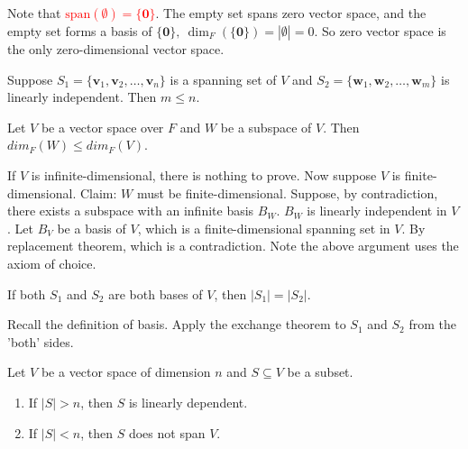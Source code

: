 \documentclass[12pt]{article}
\begin{document}
Note that \textcolor{red}{$\text{span}(\emptyset)=\{\mathbf{0}\}$}.
The empty set spans zero vector space, and the empty set forms a basis of $\{\mathbf{0}\},\ \dim_F(\{\mathbf{0}\})=|\emptyset|=0$.
So zero vector space is the only zero-dimensional vector space.

\begin{theorem}
    Suppose $S_1=\{\mathbf{v}_1,\mathbf{v}_2, \ldots ,\mathbf{v}_n\}$ is a spanning set of $V$ and
    $S_2=\{\mathbf{w}_1, \mathbf{w}_2, \ldots ,\mathbf{w}_m\}$ is linearly independent.
    Then $m\leq n$.
\end{theorem}

\begin{theorem}
    Let $V$ be a vector space over $F$ and $W$ be a subspace of $V$. Then $dim_F(W)\leq dim_F(V)$.
\end{theorem}

\begin{pfbox}
    If $V$ is infinite-dimensional, there is nothing to prove.
    Now suppose $V$ is finite-dimensional. Claim: $W$ must be finite-dimensional.
    Suppose, by contradiction, there exists a subspace with an infinite basis $B_W$. $B_W$ is linearly independent in $V$. 
    Let $B_V$ be a basis of $V$, which is a finite-dimensional spanning set in $V$. By replacement theorem, which is a contradiction.
    Note the above argument uses the axiom of choice.
\end{pfbox}

\begin{theorem}
    If both $S_1$ and $S_2$ are both bases of $V$, then $|S_1|=|S_2|$.
\end{theorem}

\begin{pfbox}  
    Recall the definition of basis.
    Apply the exchange theorem to $S_1$ and $S_2$ from the 'both' sides.
\end{pfbox}



\begin{theorem}
    Let $V$ be a vector space of dimension $n$ and $S\subseteq V$ be a subset.
    \begin{enumerate}
        \item If $|S|>n$, then $S$ is linearly dependent.
        \item If $|S|<n$, then $S$ does not span $V$.
    \end{enumerate}
\end{theorem}
\end{document}
